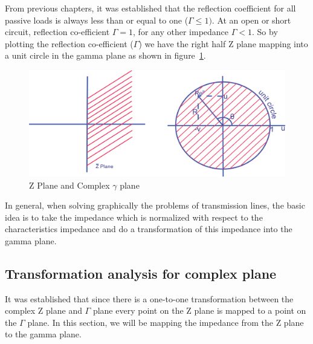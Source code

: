 From previous chapters, it was established that the reflection coefficient for all passive loads is always less than or equal to one ($\Gamma\leq 1)$. At an open or short circuit, reflection co-efficient $\Gamma = 1$, for any other impedance $\Gamma < 1$.  So by plotting the reflection co-efficient ($\Gamma$) we have the right half Z plane mapping into a unit circle in the gamma plane as shown in figure~\ref{fig:oiuhgvcx}.
\begin{figure}[h]
\centering
\includegraphics[width=0.7\linewidth]{./graphics/oiuhgvcx}
\caption{Z Plane and Complex $\gamma$ plane}
\label{fig:oiuhgvcx}
\end{figure}

In general, when solving graphically the problems of transmission lines, the basic idea is to take the impedance which is normalized with respect to the characteristics impedance and do a transformation of this impedance into the gamma plane.

\subsection{Transformation analysis for complex plane}
It was established that since there is a one-to-one transformation between the complex Z plane and $\Gamma$ plane every point on the Z plane is mapped to a point on the $ \Gamma$ plane. In this section, we will be mapping the impedance from the Z plane to the gamma plane.

